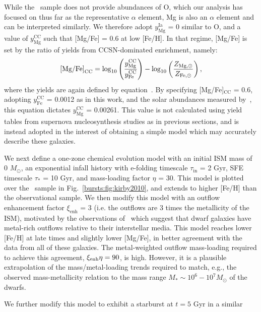 \documentclass[main.tex]{subfiles}
\begin{document}
While the~\citet{Kirby2010} sample does not provide abundances of O, which our 
analysis has focused on thus far as the representative $\alpha$ element, 
Mg is also an $\alpha$ element and can be interpreted similarly. We 
therefore adopt $y_\text{Mg}^\text{Ia}$ = 0 similar to O, and a value of 
$y_\text{Mg}^\text{CC}$ such that [Mg/Fe] = 0.6 at low [Fe/H]. In that regime, 
[Mg/Fe] is set by the ratio of yields from CCSN-dominated enrichment, namely: 
\begin{equation} 
\text{[Mg/Fe]}_\text{CC} = \log_{10}\left(\frac{\displaystyle{y_\text{Mg}^\text{CC}}}{\displaystyle{y_\text{Fe}^\text{CC}}}\right) - \log_{10}\left(\frac{\displaystyle{Z_{\text{Mg,}\odot}}}{\displaystyle{Z_{\text{Fe,}\odot}}}\right), 
\end{equation} 
where the yields are again defined by equation~. 
By specifying [Mg/Fe]$_\text{CC}$ = 0.6, adopting $y_\text{Fe}^\text{CC}$ = 
0.0012 as in this work, and the solar abundances measured 
by~\citet{Asplund2009}, this equation dictates $y_\text{Mg}^\text{CC}$ = 
0.00261. This value is not calculated using yield tables from supernova 
nucleosynthesis studies as in previous sections, and is instead adopted in the 
interest of obtaining a simple model which may accurately describe these 
galaxies. 
\par 
We next define a one-zone chemical evolution model with an initial ISM mass of 
0 $M_\odot$, an exponential infall history with e-folding timescale 
$\tau_\text{in}$ = 2 Gyr, SFE timescale $\tau_*$ = 10 Gyr, and mass-loading 
factor $\eta$ = 30. This model is plotted over the~\citet{Kirby2010} sample in 
Fig.~\ref{bursts:fig:kirby2010}, and extends to higher [Fe/H] than the observational 
sample. We then modify this model with an outflow enhancement factor 
$\xi_\text{enh}$ = 3 (i.e. the outflows are 3 times the metallicity of the 
ISM), motivated by the observations of~\citet{Chisholm2018} which suggest 
that dwarf galaxies have metal-rich outflows relative to their interstellar 
media. This model reaches lower [Fe/H] at late times and slightly lower 
[Mg/Fe], in better agreement with the data from all of these galaxies. 
The metal-weighted outflow mass-loading required to achieve this agreement,
$\xi_{\rm enh}\eta = 90$, is high.
However, it is a plausible extrapolation of the mass/metal-loading trends
required to match, e.g., the observed mass-metallicity relation
\citep{Finlator2008,Peeples2011} to the mass range
$M_* \sim 10^6-10^7 M_\odot$ of the dwarfs.
\par
We further modify this model to exhibit a starburst at $t = 5$ Gyr in a similar 
\end{document}
